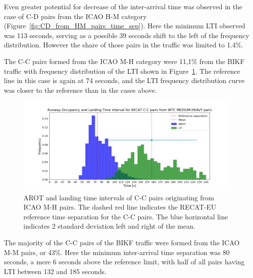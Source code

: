 Even greater potential for decrease of the inter-arrival time was observed in the case of C-D pairs from the ICAO H-M category (Figure~\ref{fig:CD_from_HM_pairs_time_sep}). Here the minimum LTI observed was 113 seconds, serving as a possible 39 seconds shift to the left of the frequency distribution. However the share of those pairs in the traffic was limited to 1.4\%.

The C-C pairs formed from the ICAO M-H category were 11,1\% from the BIKF traffic with frequency distribution of the LTI shown in Figure~\ref{fig:CC_from_MH_pairs_time_sep}. The reference line in this case is again at 74 seconds, and the LTI frequency distribution curve was closer to the reference than in the cases above.

\begin{figure}[h]
    \centering
    \includegraphics[width=1\textwidth]{graphics/fig_CC_from_MH_pairs_time_sep.png}
    \caption[AROT and LTI of C-C pairs originating from ICAO M-H pairs]{AROT and landing time intervals of C-C pairs originating from ICAO M-H pairs. The dashed red line indicates the RECAT-EU reference time separation for the C-C pairs. The blue horizontal line indicates 2 standard deviation left and right of the mean.}
    \label{fig:CC_from_MH_pairs_time_sep}
\end{figure}

The majority of the C-C pairs of the BIKF traffic were formed from the ICAO M-M pairs, or 43\%. Here the minimum inter-arrival time separation was 80 seconds, a mere 6 seconds above the reference limit, with half of all pairs having LTI between 132 and 185 seconds.

